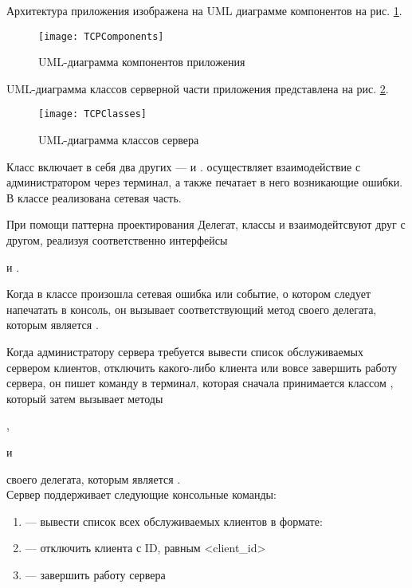 Архитектура приложения изображена на UML диаграмме компонентов на рис. \ref{fig:tcp-comp}.

\begin{figure}[H]
	\centering
	\texttt{[image: TCPComponents]}
	\caption{UML-диаграмма компонентов  приложения}
	\label{fig:tcp-comp}
\end{figure}

UML-диаграмма классов серверной части приложения представлена на рис. \ref{fig:tcp-classes}.

\begin{figure}[H]
	\centering
	\texttt{[image: TCPClasses]}
	\caption{UML-диаграмма классов  сервера}
	\label{fig:tcp-classes}
\end{figure}

Класс  включает в себя два других ---  и .  осуществляет взаимодействие с администратором через терминал, а также печатает в него возникающие ошибки.  В классе  реализована сетевая часть. 

При помощи паттерна проектирования Делегат, классы  и  взаимодейтсвуют друг с другом, реализуя соответственно интерфейсы 

 и .

Когда в классе  произошла сетевая ошибка или событие, о котором следует напечатать в консоль, он вызывает соответствующий метод  своего делегата, которым является .

Когда администратору сервера требуется вывести список обслуживаемых сервером клиентов, отключить какого-либо клиента или вовсе завершить работу сервера, он пишет команду в терминал, которая сначала принимается классом , который затем вызывает методы

,

 и 
 
 своего делегата, которым является .\\[3mm]

Сервер поддерживает следующие консольные команды:

\begin{enumerate}
	\item {} --- вывести список всех обслуживаемых клиентов в формате:\\ 
	\item {} --- отключить клиента с ID, равным <client\_id>
	\item {} --- завершить работу сервера
\end{enumerate}

